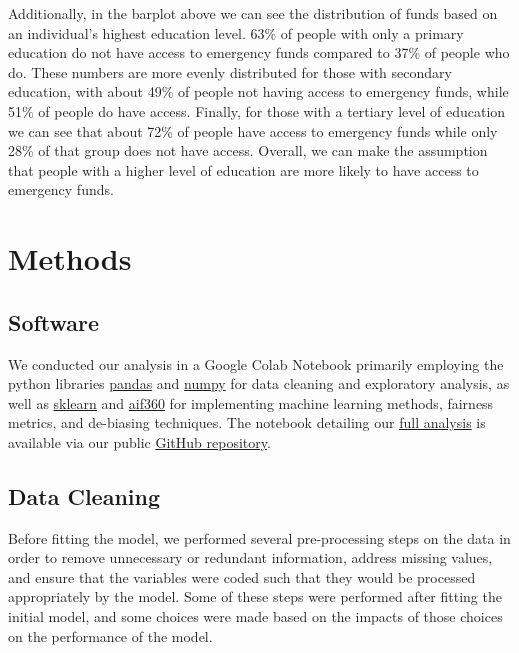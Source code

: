 \documentclass[water,article,submit,moreauthors,pdftex]{mdpi}
\begin{document}
Additionally, in the barplot above we can see the distribution of funds
based on an individual's highest education level. 63\% of people with
only a primary education do not have access to emergency funds compared
to 37\% of people who do. These numbers are more evenly distributed for
those with secondary education, with about 49\% of people not having
access to emergency funds, while 51\% of people do have access. Finally,
for those with a tertiary level of education we can see that about 72\%
of people have access to emergency funds while only 28\% of that group
does not have access. Overall, we can make the assumption that people
with a higher level of education are more likely to have access to
emergency funds.

\hypertarget{methods}{%
\section{Methods}\label{methods}}

\hypertarget{software}{%
\subsection{Software}\label{software}}

We conducted our analysis in a Google Colab Notebook primarily employing
the python libraries \href{https://pandas.pydata.org/}{pandas} and
\href{https://numpy.org/}{numpy} for data cleaning and exploratory
analysis, as well as \href{https://scikit-learn.org/stable/}{sklearn}
and \href{https://aif360.readthedocs.io/en/latest/}{aif360} for
implementing machine learning methods, fairness metrics, and de-biasing
techniques. The notebook detailing our
\href{https://github.com/sds-capstone/2022-09-proj7-women-at-table/blob/main/final_project.ipynb}{full
analysis} is available via our public
\href{https://github.com/sds-capstone/2022-09-proj7-women-at-table}{GitHub
repository}.

\hypertarget{data-cleaning}{%
\subsection{Data Cleaning}\label{data-cleaning}}

Before fitting the model, we performed several pre-processing steps on
the data in order to remove unnecessary or redundant information,
address missing values, and ensure that the variables were coded such
that they would be processed appropriately by the model. Some of these
steps were performed after fitting the initial model, and some choices
were made based on the impacts of those choices on the performance of
the model.
\end{document}
